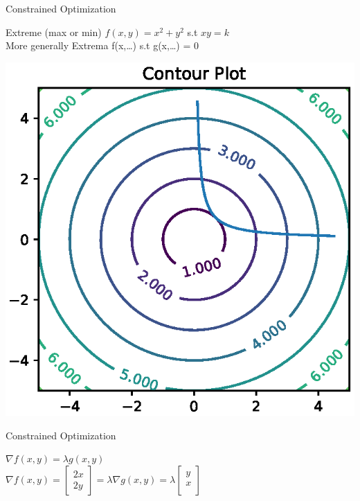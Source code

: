 \documentclass{beamer}
\begin{document}
\begin{frame}{Constrained Optimization}
    
    Extreme (max or min) $f(x,y) = x^{2}+y^{2}$ s.t $xy=k$\\
    
    \vspace{2em}
    More generally Extrema f(x,\dots) s.t g(x,\dots) = 0
  		\begin{center}
       		\includegraphics[totalheight=6cm]{ml-maths/contour-plot-6.eps}
   		\end{center}



\end{frame}

\begin{frame}{Constrained Optimization}
    
    $\nabla f(x,y) = \lambda g(x,y)$\\
    $\nabla f(x,y) = \begin{bmatrix}
    2x\\
    2y
    \end{bmatrix}
    = \lambda \nabla g(x,y)  = \lambda \begin{bmatrix}
    y\\
    x\\
    \end{bmatrix}$
\end{frame}
\end{document}
